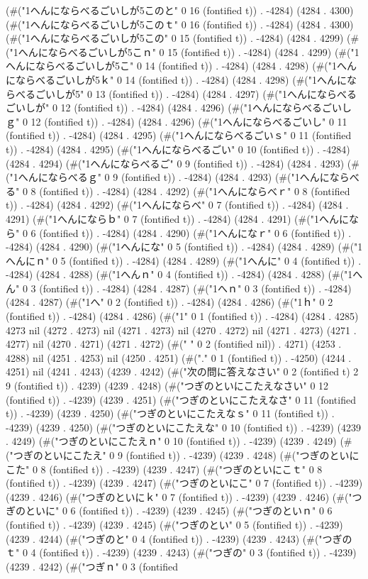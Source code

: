 (#("1へんにならべるごいしが5このと" 0 16 (fontified t)) . -4284) (4284 . 4300) (#("1へんにならべるごいしが5このｔ" 0 16 (fontified t)) . -4284) (4284 . 4300) (#("1へんにならべるごいしが5この" 0 15 (fontified t)) . -4284) (4284 . 4299) (#("1へんにならべるごいしが5こｎ" 0 15 (fontified t)) . -4284) (4284 . 4299) (#("1へんにならべるごいしが5こ" 0 14 (fontified t)) . -4284) (4284 . 4298) (#("1へんにならべるごいしが5ｋ" 0 14 (fontified t)) . -4284) (4284 . 4298) (#("1へんにならべるごいしが5" 0 13 (fontified t)) . -4284) (4284 . 4297) (#("1へんにならべるごいしが" 0 12 (fontified t)) . -4284) (4284 . 4296) (#("1へんにならべるごいしｇ" 0 12 (fontified t)) . -4284) (4284 . 4296) (#("1へんにならべるごいし" 0 11 (fontified t)) . -4284) (4284 . 4295) (#("1へんにならべるごいｓ" 0 11 (fontified t)) . -4284) (4284 . 4295) (#("1へんにならべるごい" 0 10 (fontified t)) . -4284) (4284 . 4294) (#("1へんにならべるご" 0 9 (fontified t)) . -4284) (4284 . 4293) (#("1へんにならべるｇ" 0 9 (fontified t)) . -4284) (4284 . 4293) (#("1へんにならべる" 0 8 (fontified t)) . -4284) (4284 . 4292) (#("1へんにならべｒ" 0 8 (fontified t)) . -4284) (4284 . 4292) (#("1へんにならべ" 0 7 (fontified t)) . -4284) (4284 . 4291) (#("1へんにならｂ" 0 7 (fontified t)) . -4284) (4284 . 4291) (#("1へんになら" 0 6 (fontified t)) . -4284) (4284 . 4290) (#("1へんになｒ" 0 6 (fontified t)) . -4284) (4284 . 4290) (#("1へんにな" 0 5 (fontified t)) . -4284) (4284 . 4289) (#("1へんにｎ" 0 5 (fontified t)) . -4284) (4284 . 4289) (#("1へんに" 0 4 (fontified t)) . -4284) (4284 . 4288) (#("1へんｎ" 0 4 (fontified t)) . -4284) (4284 . 4288) (#("1へん" 0 3 (fontified t)) . -4284) (4284 . 4287) (#("1へｎ" 0 3 (fontified t)) . -4284) (4284 . 4287) (#("1へ" 0 2 (fontified t)) . -4284) (4284 . 4286) (#("1ｈ" 0 2 (fontified t)) . -4284) (4284 . 4286) (#("1" 0 1 (fontified t)) . -4284) (4284 . 4285) 4273 nil (4272 . 4273) nil (4271 . 4273) nil (4270 . 4272) nil (4271 . 4273) (4271 . 4277) nil (4270 . 4271) (4271 . 4272) (#("  " 0 2 (fontified nil)) . 4271) (4253 . 4288) nil (4251 . 4253) nil (4250 . 4251) (#("." 0 1 (fontified t)) . -4250) (4244 . 4251) nil (4241 . 4243) (4239 . 4242) (#("次の問に答えなさい" 0 2 (fontified t) 2 9 (fontified t)) . 4239) (4239 . 4248) (#("つぎのといにこたえなさい" 0 12 (fontified t)) . -4239) (4239 . 4251) (#("つぎのといにこたえなさ" 0 11 (fontified t)) . -4239) (4239 . 4250) (#("つぎのといにこたえなｓ" 0 11 (fontified t)) . -4239) (4239 . 4250) (#("つぎのといにこたえな" 0 10 (fontified t)) . -4239) (4239 . 4249) (#("つぎのといにこたえｎ" 0 10 (fontified t)) . -4239) (4239 . 4249) (#("つぎのといにこたえ" 0 9 (fontified t)) . -4239) (4239 . 4248) (#("つぎのといにこた" 0 8 (fontified t)) . -4239) (4239 . 4247) (#("つぎのといにこｔ" 0 8 (fontified t)) . -4239) (4239 . 4247) (#("つぎのといにこ" 0 7 (fontified t)) . -4239) (4239 . 4246) (#("つぎのといにｋ" 0 7 (fontified t)) . -4239) (4239 . 4246) (#("つぎのといに" 0 6 (fontified t)) . -4239) (4239 . 4245) (#("つぎのといｎ" 0 6 (fontified t)) . -4239) (4239 . 4245) (#("つぎのとい" 0 5 (fontified t)) . -4239) (4239 . 4244) (#("つぎのと" 0 4 (fontified t)) . -4239) (4239 . 4243) (#("つぎのｔ" 0 4 (fontified t)) . -4239) (4239 . 4243) (#("つぎの" 0 3 (fontified t)) . -4239) (4239 . 4242) (#("つぎｎ" 0 3 (fontified 